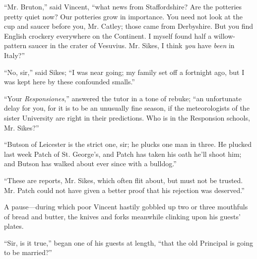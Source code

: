 ``Mr. Bruton,'' said Vincent, ``what news from
Staffordshire? Are the potteries pretty quiet now? Our potteries grow
in importance. You need not look at the cup and saucer before you, Mr.
Catley; those came from Derbyshire. But you find English crockery
everywhere on the Continent. I myself found half a willow-pattern
saucer in the crater of Vesuvius. Mr. Sikes, I think \emph{you} have \emph{been}
in Italy?''

``No, sir,'' said Sikes; ``I was near going; my family
set off a fortnight ago, but I was kept here by these confounded
smalls.''

``Your \emph{Responsiones},'' answered the tutor in a tone
of rebuke; ``an unfortunate delay for you, for it is to be an
unusually fine season, if the meteorologists of the sister University
are right in their predictions. Who is in the Responsion schools, Mr.
Sikes?''

``Butson of Leicester is the strict one, sir; he plucks one man
in three. He plucked last week Patch of St. George's, and Patch has
taken his oath he'll shoot him; and Butson has walked about ever since
with a bulldog.''

``These are reports, Mr. Sikes, which often flit about, but
must not be trusted. Mr. Patch could not have given a better proof
that his rejection was deserved.''

A pause—during which poor Vincent hastily gobbled up two or three
mouthfuls of bread and butter, the knives and forks meanwhile clinking
upon his guests' plates.

``Sir, is it true,'' began one of his guests at length,
``that the old Principal is going to be married?''

